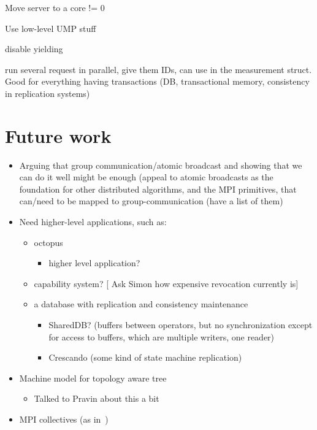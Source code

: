 \documentclass{article}
\newcommand{\stefan}[1]{
  {\color{skRed}[{\color{red}{SK}} #1]}}
\begin{document}


\begin{itemize}
\item Move server to a core != 0
\item Use low-level UMP stuff
{
\renewcommand{\labelitemi}{\checkmark}
\item disable yielding
}
\item run several request in parallel, give them IDs, can use in the
  measurement struct. Good for everything having transactions (DB,
  transactional memory, consistency in replication systems)
\end{itemize}

\section{Future work}

\begin{itemize}
\item Arguing that group communication/atomic broadcast and showing
  that we can do it well might be enough (appeal to atomic broadcasts
  as the foundation for other distributed algorithms, and the MPI
  primitives, that can/need to be mapped to group-communication (have
  a list of them) 
\item Need higher-level applications, such as:
  \begin{itemize}
  \item octopus
    \begin{itemize}
    \item higher level application?
    \end{itemize}
  \item capability system? \stefan{Ask Simon how expensive revocation
      currently is}
  \item a database with replication and consistency maintenance
    \begin{itemize}
    \item SharedDB? (buffers between operators, but no synchronization
      except for access to buffers, which are multiple writers, one
      reader)
    \item Crescando (some kind of state machine replication)
    \end{itemize}
  \end{itemize}
\item Machine model for topology aware tree
  \begin{itemize}
  \item Talked to Pravin about this a bit
  \end{itemize}
\item MPI collectives (as in~\cite{Tu2008})
\end{itemize}
\end{document}
